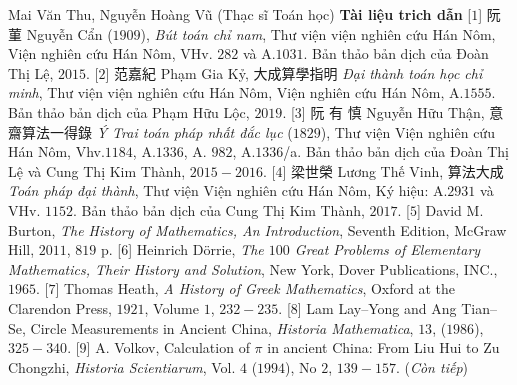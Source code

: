 \begin{multicols}{2}
	\vskip 0.1cm
	Mai Văn Thu, Nguyễn Hoàng Vũ (Thạc sĩ Toán học)
	\vskip 0.1cm
	\textbf{\color{lichsutoanhoc}Tài liệu trich dẫn}
	\vskip 0.1cm
	[$1$]   阮菫 Nguyễn Cẩn ($1909$),  \textit{Bút toán chỉ nam}, Thư viện viện nghiên cứu Hán Nôm, Viện nghiên cứu Hán Nôm, VHv. $282$ và A.$1031$. Bản thảo bản dịch của Đoàn Thị Lệ, $2015$.
	\vskip 0.1cm
	[$2$] 范嘉紀  Phạm Gia Kỷ,  大成算學指明  \textit{Đại thành toán học chỉ minh}, Thư viện viện nghiên cứu Hán Nôm, Viện nghiên cứu Hán Nôm, A.$1555$. Bản thảo bản dịch của Phạm Hữu Lộc, $2019$.
	\vskip 0.1cm 
	[$3$]  阮 有 慎 Nguyễn Hữu Thận,  意齋算法一得錄  \textit{Ý Trai toán pháp nhất đắc lục} ($1829$), Thư viện Viện nghiên cứu Hán Nôm, Vhv.$1184$, A.$1336$, A. $982$, A.$1336$/a. Bản thảo bản dịch của Đoàn Thị Lệ và Cung Thị Kim Thành, $2015-2016$.
	\vskip 0.1cm 
	[$4$] 梁世榮  Lương Thế Vinh,  算法大成 \textit{Toán pháp đại thành}, Thư viện Viện nghiên cứu Hán Nôm, Ký hiệu: A.$2931$ và VHv. $1152$. Bản thảo bản dịch của Cung Thị Kim Thành, $2017$.
	\vskip 0.1cm
	[$5$] David M. Burton, \textit{The History of Mathematics, An Introduction}, Seventh Edition, McGraw Hill, $2011$, $819$ p.
	\vskip 0.1cm
	[$6$] Heinrich Dörrie, \textit{The $100$ Great Problems of Elementary Mathematics, Their History and Solution}, New York, Dover Publications, INC., $1965$.
	\vskip 0.1cm     
	[$7$] Thomas Heath, \textit{A History of Greek Mathematics}, Oxford at the Clarendon Press, $1921$, Volume $1$, $232-235$.
	\vskip 0.1cm
	[$8$] Lam Lay--Yong and Ang Tian--Se, Circle Measurements in Ancient China, \textit{Historia Mathematica}, $13$,  ($1986$), $325-340$.
	\vskip 0.1cm
	[$9$] A. Volkov, Calculation of $\pi$ in ancient China: From Liu Hui to Zu Chongzhi, \textit{Historia Scientiarum}, Vol. $4$ ($1994$), No $2$, $139-157$. 
	\vskip 0.1cm
	\hfill (\textit{Còn tiếp})
\end{multicols}